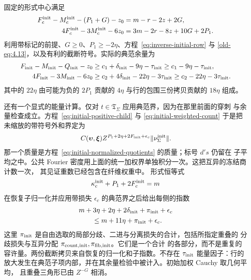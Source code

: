 固定的形式中心满足
\[
 \begin{aligned}
 F_c^{\rm init}-M_c^{\rm init}-(P_1+G)-z_0&=m-r-2z+2G,\\
 4F_c^{\rm init}-3M_c^{\rm init}-6z_0&=3m-2r-8z+10G+2P_1.
 \end{aligned}
\]
利用带标记的前提、\(G\ge0\)、\(P_1\ge-2\eta\)、方程~\eqref{eq:inverse-initial-row} 与
\eqref{old-eq:4.13}，以及有利的截断符号。实际的典范余量为
\begin{equation}\label{eq:inverse-initial-margins}
 \begin{aligned}
 F_{\rm init}-M_{\rm init}-Q_{\rm init}-z_0
   &\ge c_1+\delta_{\rm init}-9\eta-\tau_{\rm init}
     \ge c_1-9\eta-\tau_{\rm init},\\
 4F_{\rm init}-3M_{\rm init}-6z_0
   &\ge c_2+4\delta_{\rm init}-22\eta-3\tau_{\rm init}
     \ge c_2-22\eta-3\tau_{\rm init}.
 \end{aligned}
\end{equation}
其中的 \(22\eta\) 由可能为负的 \(2P_1\) 贡献的 \(4\eta\) 与行的包围三份拷贝贡献的
\(18\eta\) 组成。

还有一个显式的能量计算。仅对 \(t\in\mathfrak T_\Sigma\) 应用典范界，因为在那里前面的穿刺
与余量检查成立。方程~\eqref{eq:initial-positive-child} 与 \eqref{eq:initial-weighted-count}
于是把未缩放的带符号外和界定为
\[
 C(\boldsymbol\upsilon,\boldsymbol\xi)
 Z^{P_1+2\eta+2F_{\rm init}+\epsilon_c}
 \|\nu_\Sigma^{\rm init}\|.
\]
那一个质量是方程~\eqref{eq:initial-normalized-quotients} 的质量；标号 \(d's\) 仍留在
子平均之中。公共 Fourier 密度用上面的统一加权界单独积分一次。这把互异的冻结商计数一次，
其见证重数已经包含在纤维权重中。
形式恒等式
\[
 \kappa_c^{\rm init}+P_1+2F_c^{\rm init}=m
\]
在恢复子归一化并应用带损失 \(\epsilon_c\) 的典范界之后给出每侧的指数
\begin{equation}\label{eq:inverse-initial-energy}
 \begin{split}
 &m+3\eta+2\eta+2\delta_{\rm init}+\pi_{\rm init}+\epsilon_c\\
 &\qquad\le m+11\eta+\pi_{\rm init}+\epsilon_c.
 \end{split}
\end{equation}
这里 \(\pi_{\rm init}\) 是自由选取的局部分歧、二进与分离损失的合计，包括所指定重叠的
分歧损失与互异分配 \(\pi_{{\rm count},{\rm init}},\pi_{{\rm fib},{\rm init}}\)。它们是一个合计
的各部分，而不是重复的容许量。两份截断拷贝来自恢复的归一化和子指数。不存在 \(\tau_{\rm init}\)
能量因子：行的放大发生在典范子项内部，并在其余量检验中被计入。初始加权 Cauchy 取几何平均，
且重叠三角形已由 \(Z^{-G}\) 相消。

